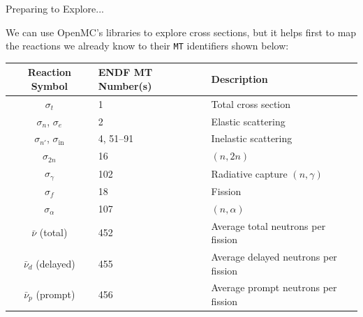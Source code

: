 \documentclass[aspectratio=1610]{beamer}
\begin{document}
\begin{frame}{Preparing to Explore...}

We can use OpenMC's libraries to explore cross sections, but
it helps first to map the reactions we already know to their 
{\tt MT} identifiers shown below:

\begin{table}[t]
\centering
\begin{tabular}{cll}
\toprule
Reaction Symbol & ENDF MT Number(s) & Description \\
\midrule
$\sigma_{t}$            & 1        & Total cross section \\
$\sigma_{n}$, $\sigma_{e}$ & 2        & Elastic scattering \\
$\sigma_{n'}$, $\sigma_{\mathrm{in}}$ & 4, 51--91 & Inelastic scattering \\
$\sigma_{2n}$           & 16       & $(n,2n)$  \\
$\sigma_{\gamma}$       & 102      & Radiative capture $(n,\gamma)$ \\
$\sigma_{f}$            & 18       & Fission \\
$\sigma_{\alpha}$       & 107      & $(n,\alpha)$ \\
\midrule
$\bar{\nu}$ (total)     & 452      & Average total neutrons per fission \\
$\bar{\nu}_{d}$ (delayed) & 455    & Average delayed neutrons per fission \\
$\bar{\nu}_{p}$ (prompt)  & 456    & Average prompt neutrons per fission \\
\bottomrule
\end{tabular}
\end{table}


\end{frame}
\end{document}
